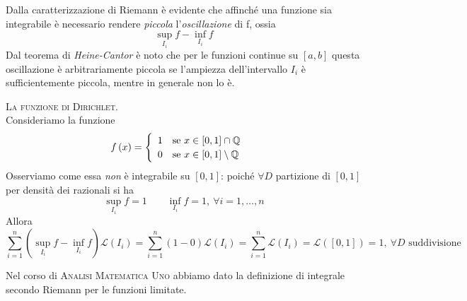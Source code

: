 Dalla caratterizzazione di Riemann è evidente che affinché una funzione sia integrabile è necessario rendere \textit{piccola} l’\textit{oscillazione} di f, ossia
\begin{equation*}
	\sup_{I_i}f-\inf_{I_i}f
\end{equation*}
Dal teorema di \textit{Heine-Cantor} è noto che per le funzioni continue su $\left[a,b\right]$ questa oscillazione è arbitrariamente piccola se l’ampiezza dell’intervallo $I_i$ è
sufficientemente piccola, mentre in generale non lo è.
\begin{example}\textsc{La funzione di Dirichlet.}\\
	Consideriamo la funzione
	\begin{equation}
		f\left(x\right)=
		\begin{cases}
			\begin{array}{ll}
				1&\text{se }x\in\left[0,1\right]\cap\mathbb{Q}\\
				0&\text{se }x\in\left[0,1\right]\setminus\mathbb{Q}\\
			\end{array}
		\end{cases}
	\end{equation}
Osserviamo come essa \textit{non} è integrabile su $\left[0,1\right]$: poiché $\forall D$ partizione di $\left[0,1\right]$ per densità dei razionali si ha
\begin{equation*}
	\sup_{I_i}f=1\qquad	\inf_{I_i}f=1,\ \forall i=1,\ldots,n
\end{equation*}
Allora
\begin{equation*}
	\sum_{i=1}^{n}\left(\sup_{I_i}f-\inf_{I_i}f\right)\mathcal{L}\left(I_i\right)=\sum_{i=1}^{n}\left(1-0\right)\mathcal{L}\left(I_i\right)=\sum_{i=1}^{n}\mathcal{L}\left(I_i\right)=\mathcal{L}\left(\left[0,1\right]\right)=1,\ \forall D\text{ suddivisione}
\end{equation*}
\end{example}
Nel corso di \textsc{Analisi Matematica Uno} abbiamo dato la definizione di integrale secondo Riemann per le funzioni limitate.
